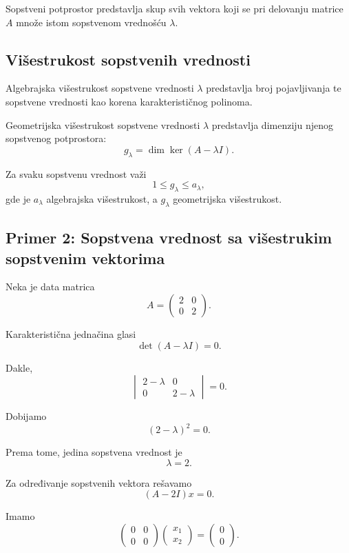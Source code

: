 \documentclass[12pt,a4paper]{report}
\begin{document}
Sopstveni potprostor predstavlja skup svih vektora koji
se pri delovanju matrice $A$ množe istom sopstvenom vrednošću
$\lambda$.

\subsection{Višestrukost sopstvenih vrednosti}


Algebrajska višestrukost sopstvene vrednosti $\lambda$
predstavlja broj pojavljivanja te sopstvene vrednosti
kao korena karakterističnog polinoma.

Geometrijska višestrukost sopstvene vrednosti $\lambda$
predstavlja dimenziju njenog sopstvenog potprostora:
\[
\boxed{
	g_\lambda=\dim\ker(A-\lambda I).
}
\]


Za svaku sopstvenu vrednost važi
\[
1\leq g_\lambda\leq a_\lambda,
\]
gde je $a_\lambda$ algebrajska višestrukost, a
$g_\lambda$ geometrijska višestrukost.

\subsection{Primer 2: Sopstvena vrednost sa višestrukim
	sopstvenim vektorima}

Neka je data matrica
\[
A=
\begin{pmatrix}
	2 & 0\\
	0 & 2
\end{pmatrix}.
\]

Karakteristična jednačina glasi
\[
\det(A-\lambda I)=0.
\]

Dakle,
\[
\begin{vmatrix}
	2-\lambda & 0\\
	0 & 2-\lambda
\end{vmatrix}=0.
\]

Dobijamo
\[
(2-\lambda)^2=0.
\]

Prema tome, jedina sopstvena vrednost je
\[
\boxed{\lambda=2.}
\]

Za određivanje sopstvenih vektora rešavamo
\[
(A-2I)x=0.
\]

Imamo
\[
\begin{pmatrix}
	0 & 0\\
	0 & 0
\end{pmatrix}
\begin{pmatrix}
	x_1\\
	x_2
\end{pmatrix}
=
\begin{pmatrix}
	0\\
	0
\end{pmatrix}.
\]
\end{document}
